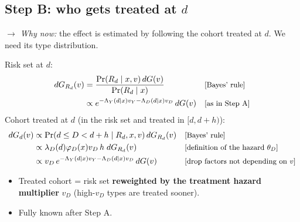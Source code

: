 \documentclass[11pt]{article}
\newcommand{\1}{\mathbf{1}}
\newcommand{\why}[1]{\text{\small[#1]}}
\newcommand{\whynow}[1]{\par\noindent\textit{$\rightarrow$ Why now:} #1\par}
\begin{document}
\subsection{Step B: who gets treated at $d$}
\whynow{the effect is estimated by following the cohort treated at $d$. We need its type distribution.}
Risk set at $d$:
\begin{align}
  dG_{R_d}(v) &= \frac{\Pr(R_d\mid x,v)\,dG(v)}{\Pr(R_d\mid x)} && \why{Bayes' rule} \nonumber\\
  &\propto e^{-\Lambda_Y(d\mid x)v_Y-\Lambda_D(d\mid x)v_D}\,dG(v) && \why{as in Step A} \nonumber
\end{align}
Cohort treated at $d$ (in the risk set and treated in $[d,d+h)$):
\begin{align}
  dG_d(v) &\propto \Pr(d\le D<d+h\mid R_d,x,v)\,dG_{R_d}(v) && \why{Bayes' rule} \nonumber\\
  &\propto \lambda_D(d)\varphi_D(x)v_D\,h\;dG_{R_d}(v) && \why{definition of the hazard $\theta_D$} \nonumber\\
  &\propto v_D\,e^{-\Lambda_Y(d\mid x)v_Y-\Lambda_D(d\mid x)v_D}\,dG(v) && \why{drop factors not depending on $v$} \label{eq:Gs}
\end{align}
\begin{itemize}
  \item Treated cohort = risk set \textbf{reweighted by the treatment hazard multiplier} $v_D$ (high-$v_D$ types are treated sooner).
  \item Fully known after Step A.
\end{itemize}
\end{document}
